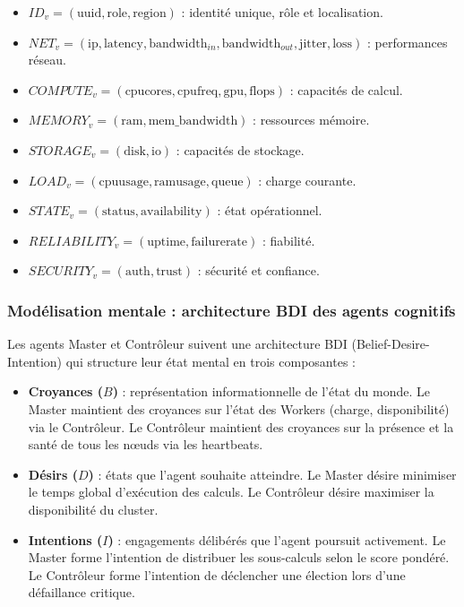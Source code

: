 \documentclass[12pt,a4paper]{report}
\begin{document}
\begin{itemize}
    \item[*] $ID_v = (\text{uuid}, \text{role}, \text{region})$ : identité unique, rôle et localisation.
    \item[*] $NET_v = (\text{ip}, \text{latency}, \text{bandwidth}_{in}, \text{bandwidth}_{out}, \text{jitter}, \text{loss})$ : performances réseau.
    \item[*] $COMPUTE_v = (\text{cpucores}, \text{cpufreq}, \text{gpu}, \text{flops})$ : capacités de calcul.
    \item[*] $MEMORY_v = (\text{ram}, \text{mem\_bandwidth})$ : ressources mémoire.
    \item[*] $STORAGE_v = (\text{disk}, \text{io})$ : capacités de stockage.
    \item[*] $LOAD_v = (\text{cpuusage}, \text{ramusage}, \text{queue})$ : charge courante.
    \item[*] $STATE_v = (\text{status}, \text{availability})$ : état opérationnel.
    \item[*] $RELIABILITY_v = (\text{uptime}, \text{failurerate})$ : fiabilité.
    \item[*] $SECURITY_v = (\text{auth}, \text{trust})$ : sécurité et confiance.
\end{itemize}

\subsubsection{Modélisation mentale : architecture BDI des agents cognitifs}

Les agents Master et Contrôleur suivent une architecture BDI (Belief-Desire-Intention) qui structure leur état mental en trois composantes \cite{wooldridge} :

\begin{itemize}
    \item \textbf{Croyances ($B$)} : représentation informationnelle de l'état du monde. Le Master maintient des croyances sur l'état des Workers (charge, disponibilité) via le Contrôleur. Le Contrôleur maintient des croyances sur la présence et la santé de tous les nœuds via les heartbeats.
    \item \textbf{Désirs ($D$)} : états que l'agent souhaite atteindre. Le Master désire minimiser le temps global d'exécution des calculs. Le Contrôleur désire maximiser la disponibilité du cluster.
    \item \textbf{Intentions ($I$)} : engagements délibérés que l'agent poursuit activement. Le Master forme l'intention de distribuer les sous-calculs selon le score pondéré. Le Contrôleur forme l'intention de déclencher une élection lors d'une défaillance critique.
\end{itemize}
\end{document}
